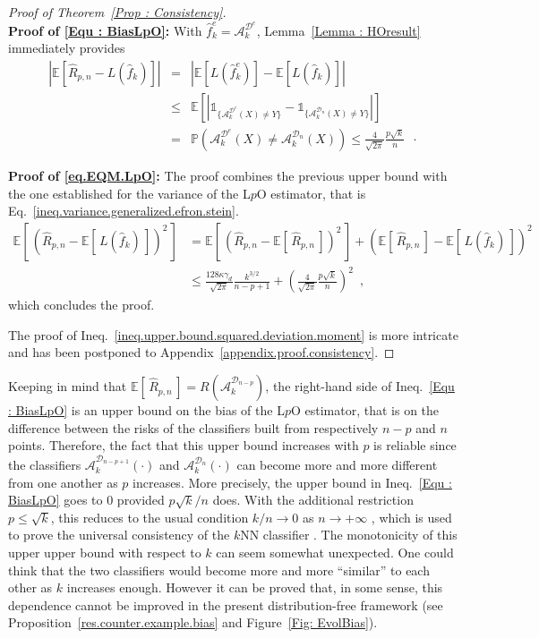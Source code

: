 \documentclass[twoside,11pt]{article}
\numberwithin{equation}{section}
\newcommand{\prob}[1]{\mathbb{P}\left(#1 \right)}
\newcommand{\1}{\mathds{1}}%
\newcommand{\paren}[1]{\left( #1 \right)}
\newcommand{\croch}[1]{\left[\, #1 \,\right]}
\newcommand{\abs}[1]{\left\lvert #1 \right\rvert} %
\newcommand{\E}{\mathbb{E}}
\newcommand{\Rh}{\widehat{R}}
\newcommand{\D}{\mathcal{D}}
\newcommand{\Dn}{\mathcal{D}_n}
\newcommand{\A}{\mathcal{A}}
\numberwithin{equation}{section}
\theoremstyle{plain}
\begin{document}
\begin{proof}[Proof of Theorem~\ref{Prop : Consistency}]
	~\\
	\textbf{Proof of \eqref{Equ : BiasLpO}:}
	With $\hat{f}^e_k = \A_k^{\D^e}$, Lemma~\ref{Lemma : HOresult} immediately provides
	\begin{eqnarray*}
		\left|\mathbb{E}\left[\Rh_{p,n}-L(\hat{f}_k)\right]\right| &=& \left|\mathbb{E}\left[L(\hat{f}^e_k)\right]-\mathbb{E}\left[L(\hat{f}_k)\right]\right|\\
		& \leq &  \mathbb{E}\left[ \abs{\1_{\{\A_k^{\D^e}(X)\neq Y\}}-\1_{\{\A_k^{\Dn}(X)\neq Y\}} } \right] \\
		&=& \prob{\A_k^{\D^e}(X)\neq \A_k^{\Dn}(X)} \leq  \frac{4}{\sqrt{2\pi}}\frac{p\sqrt{k}}{n} \enspace\cdot
	\end{eqnarray*}

	\noindent \textbf{Proof of \eqref{eq.EQM.LpO}:}
	The proof combines the previous upper bound with the one established for the variance of the L$p$O estimator, that is Eq.~\eqref{ineq.variance.generalized.efron.stein}.
	\begin{align*}
	\mathbb{E}\croch{ \paren{ \Rh_{p,n}-\E\croch{L(\hat{f}_k)} }^2 }
	& = \mathbb{E}\croch{ \paren{ \Rh_{p,n}-\E\croch{ \Rh_{p,n} } }^2 } +  \paren{ \mathbb{E}\croch{ \Rh_{p,n} } -\E\croch{L(\hat{f}_k)} }^2  \\
	& \leq  \frac{128\kappa\gamma_d}{\sqrt{2\pi}} \frac{k^{3/2}}{n-p+1}+ \paren{ \frac{4}{\sqrt{2\pi}}\frac{p\sqrt{k}}{n} }^2 \enspace ,
	\end{align*}
	which concludes the proof.

	The proof of Ineq.~\eqref{ineq.upper.bound.squared.deviation.moment} is more intricate and has been postponed to Appendix~\ref{appendix.proof.consistency}.
\end{proof}


Keeping in mind that $\E\croch{ \Rh_{p,n}} = R( \A_k^{\D_{n-p}})$, the right-hand side of Ineq.~\eqref{Equ : BiasLpO} is an upper bound on the bias of the L$p$O estimator, that is on the difference between the risks of the classifiers built from respectively $n-p$ and $n$ points. Therefore, the fact that this upper bound increases with $p$ is reliable since the classifiers $\A_k^{\D_{n-p+1}}(\cdot)$ and $\A_k^{\Dn}(\cdot)$ can become more and more different from one another as $p$ increases.
%
More precisely, the upper bound in Ineq.~\eqref{Equ : BiasLpO} goes to 0 provided $p\sqrt{k}/n$ does. With the additional restriction $p\leq \sqrt{k}$, this reduces to the usual condition $k/n\to 0$ as $n\to+\infty$  \citep[see][Chap.~6.6 for instance]{DeGyLu_1996}, which is used to prove the universal consistency of the $k$NN classifier \citep{Stone_1977}.
%
The monotonicity of this upper upper bound with respect to $k$ can seem somewhat unexpected. One could think that the two classifiers would become more and more ``similar'' to each other as $k$ increases enough.
However it can be proved that, in some sense, this dependence cannot be improved in the present distribution-free framework (see Proposition~\ref{res.counter.example.bias} and Figure~\ref{Fig: EvolBias}).
%
\end{document}
